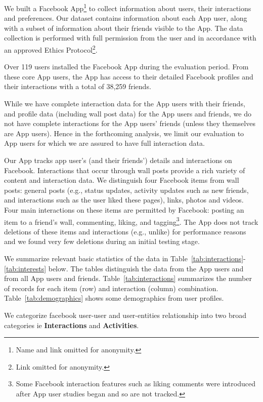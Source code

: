 
We built a Facebook App\footnote{Name and link omitted
for anonymity.} to collect information about users, 
their interactions and preferences.  
Our dataset contains information about each App user, along with a
subset of information about their friends visible to the App.  The
data collection is performed with full permission from the user and in
accordance with an approved Ethics Protocol\footnote{Link omitted for
anonymity.}.

Over 119 users installed the Facebook App during the
evaluation period. From these core App users, the App has access to their
detailed Facebook profiles and their interactions with a total of
38,259 friends.

While we have complete interaction data for the App
users with their friends, and profile data (including
wall post data) for the App users and friends, we do not have complete
interactions for the App users' friends (unless they themselves are
App users).  Hence in the forthcoming analysis, we limit our
evaluation to App users for which we are assured to have full
interaction data.

Our App tracks app user's (and their friends') details and interactions
on Facebook.  Interactions that occur through wall posts provide a
rich variety of content and interaction data.  We distinguish four
Facebook items from wall posts: general posts (e.g., status updates,
activity updates such as new friends, and interactions such as the
user liked these pages), links, photos and videos. Four main
interactions on these items are permitted by Facebook: posting an item
to a friend's wall, commenting, liking, and tagging\footnote{Some
Facebook interaction features such as liking comments were introduced
after App user studies began and so are not tracked.}.  The App does
not track deletions of these items and interactions (e.g., unlike) for
performance reasons and we found very few deletions during an initial
testing stage.

We summarize relevant basic statistics of the data in Table~\ref{tab:interactions}-\ref{tab:interests} below.
The tables distinguish the data from the App users and from
all App users and friends. Table~\ref{tab:interactions}
summarizes the number of records for each item (row) and interaction (column)
combination. Table~\ref{tab:demographics} shows 
some demographics from user profiles.

We categorize facebook user-user and user-entities relationship into two broad categories ie \textbf{Interactions} and \textbf{Activities}.

